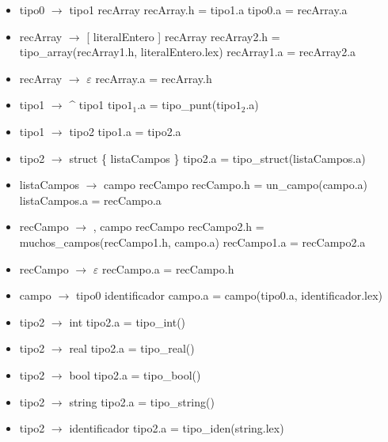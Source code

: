\documentclass[11pt]{article}
\begin{document}
        \begin{itemize}
            \item tipo0 $\rightarrow$ tipo1 recArray
                \subitem recArray.h = tipo1.a
                \subitem tipo0.a = recArray.a
            \item recArray $\rightarrow$ [ literalEntero ] recArray
                \subitem recArray2.h = tipo\_array(recArray1.h, literalEntero.lex)
                \subitem recArray1.a = recArray2.a
            \item recArray $\rightarrow$ $\varepsilon$
                \subitem recArray.a = recArray.h
            \item tipo1 $\rightarrow$ \^{} tipo1
                \subitem tipo$1_1$.a = tipo\_punt(tipo$1_2$.a)
            \item tipo1 $\rightarrow$ tipo2
                \subitem tipo1.a = tipo2.a
            \item tipo2 $\rightarrow$ struct \{ listaCampos \}
                \subitem tipo2.a = tipo\_struct(listaCampos.a)
            \item listaCampos $\rightarrow$ campo recCampo
                \subitem recCampo.h = un\_campo(campo.a)
                \subitem listaCampos.a = recCampo.a
            \item recCampo $\rightarrow$ , campo recCampo
                \subitem recCampo2.h = muchos\_campos(recCampo1.h, campo.a)
                \subitem recCampo1.a = recCampo2.a
            \item recCampo $\rightarrow$ $\varepsilon$
                \subitem recCampo.a = recCampo.h
            \item campo $\rightarrow$ tipo0 identificador
                \subitem campo.a = campo(tipo0.a, identificador.lex)
            \item tipo2 $\rightarrow$ int
                \subitem tipo2.a = tipo\_int()
            \item tipo2 $\rightarrow$ real
                \subitem tipo2.a = tipo\_real()
            \item tipo2 $\rightarrow$ bool
                \subitem tipo2.a = tipo\_bool()
            \item tipo2 $\rightarrow$ string
                \subitem tipo2.a = tipo\_string()
            \item tipo2 $\rightarrow$ identificador
                \subitem tipo2.a = tipo\_iden(string.lex)
        \end{itemize}
        \
\end{document}
